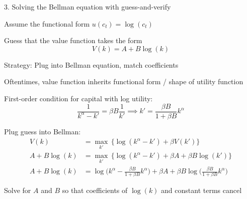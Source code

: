 \documentclass[11pt, aspectratio=169]{beamer}
\newenvironment{witemize}{\itemize\addtolength{\itemsep}{10pt}}{\enditemize}
\begin{document}
\begin{frame}{3. Solving the Bellman equation with guess-and-verify}
\begin{witemize}
\item Assume the functional form $u(c_t) = \log(c_t)$ 

\item Guess that the value function takes the form 
\begin{equation*}
	V(k) = A + B \log(k)
\end{equation*}

\item Strategy: Plug into Bellman equation, match coefficients

\item Oftentimes, value function inherits functional form / shape of utility function
\end{witemize}
\end{frame}


\begin{frame}{}
\begin{witemize}
\item First-order condition for capital with log utility:
\begin{equation*}
	\frac{1}{k^\alpha - k'} = \beta B \frac{1}{k'} \implies  k' = \frac{\beta B}{1 + \beta B} k^\alpha
\end{equation*}

\item Plug guess into Bellman:
\begin{align*}
	V(k) &= \max_{k'} \, \bigg\{ \log(k^\alpha  - k') + \beta V(k') \bigg\} \\
	A + B \log(k) &= \max_{k'} \, \bigg\{ \log(k^\alpha  - k') + \beta A + \beta B \log(k') \bigg\} \\
	A + B \log(k) &= \log\bigg(k^\alpha  - \frac{\beta B}{1 + \beta B} k^\alpha \bigg) + \beta A + \beta B \log\bigg( \frac{\beta B}{1 + \beta B} k^\alpha \bigg)
\end{align*}

\item Solve for $A$ and $B$ so that coefficients of $\log(k)$ and constant terms cancel 

\end{witemize}
\end{frame}
\end{document}
